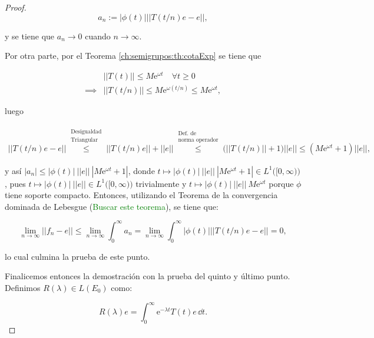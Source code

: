 \begin{proof}
    \[a_n := |\phi(t)| || T(t/n)e - e||,\]

    y se tiene que $a_n \rightarrow 0$ cuando $n \rightarrow \infty$.

    Por otra parte, por el Teorema \ref{ch:semigrupos:th:cotaExp} se tiene que

    \begin{align*}
        &||T(t)|| \leq M\mathrm{e}^{\omega t} \quad \forall t \geq 0\\
        \implies&||T(t/n)|| \leq M\mathrm{e}^{\omega (t/n)} \leq M\mathrm{e}^{\omega t},
    \end{align*}

    luego

    \begin{align*}
        ||T(t/n)e - e|| \overset{\substack{\text{Desigualdad} \\ \text{Triangular}}}{\leq} ||T(t/n)e|| + ||e|| \overset{\substack{\text{Def. de} \\ \text{norma operador}}}{\leq} \Big(||T(t/n)|| + 1 \Big )||e|| \leq (M\mathrm{e}^{\omega t} + 1)||e||,
    \end{align*}

    y así $|a_n| \leq |\phi(t)| \ ||e|| \ |M\mathrm{e}^{\omega t} + 1|$, donde $t \mapsto |\phi(t)| \ ||e|| \ |M\mathrm{e}^{\omega t} + 1| \in L^1\big([0, \infty)\big)$, pues $t \mapsto |\phi(t)| \ ||e|| \in L^1\big ([0, \infty) \big)$ trivialmente y $t \mapsto |\phi(t)| \ ||e|| \ M\mathrm{e}^{\omega t}$ porque $\phi$ tiene soporte compacto. Entonces, utilizando el Teorema de la convergencia dominada de Lebesgue (\textcolor{green}{Buscar este teorema}), se tiene que: 

    \[\lim_{n \rightarrow \infty }|| f_n - e || \leq \lim_{n \rightarrow \infty } \int_0 ^\infty a_n = \lim_{n \rightarrow \infty} \int_0^{\infty} |\phi(t)| || T(t/n)e - e|| = 0,\]

    lo cual culmina la prueba de este punto.

    Finalicemos entonces la demostración con la prueba del quinto y último punto. Definimos $R(\lambda) \in L(E_0)$ como:

    \[R(\lambda)e = \int_0^\infty \mathrm{e}^{-\lambda t}T(t)e \, \dd t.\]


\end{proof}
